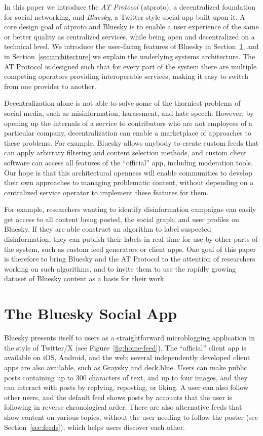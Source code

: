 \documentclass[sigconf,review]{acmart}
\begin{document}
In this paper we introduce the \emph{AT Protocol} (atproto), a decentralized foundation for social networking, and \emph{Bluesky}, a Twitter-style social app built upon it.
A core design goal of atproto and Bluesky is to enable a user experience of the same or better quality as centralized services, while being open and decentralized on a technical level.
We introduce the user-facing features of Bluesky in Section~\ref{sec:product}, and in Section~\ref{sec:architecture} we explain the underlying systems architecture.
The AT Protocol is designed such that for every part of the system there are multiple competing operators providing interoperable services, making it easy to switch from one provider to another.

Decentralization alone is not able to solve some of the thorniest problems of social media, such as misinformation, harassment, and hate speech.
However, by opening up the internals of a service to contributors who are not employees of a particular company, decentralization can enable a marketplace of approaches to these problems.
For example, Bluesky allows anybody to create custom feeds that can apply arbitrary filtering and content selection methods, and custom client software can access all features of the ``official'' app, including moderation tools.
Our hope is that this architectural openness will enable communities to develop their own approaches to managing problematic content, without depending on a centralized service operator to implement these features for them.

For example, researchers wanting to identify disinformation campaigns can easily get access to all content being posted, the social graph, and user profiles on Bluesky.
If they are able construct an algorithm to label suspected disinformation, they can publish their labels in real time for use by other parts of the system, such as custom feed generators or client apps.
One goal of this paper is therefore to bring Bluesky and the AT Protocol to the attention of researchers working on such algorithms, and to invite them to use the rapidly growing dataset of Bluesky content as a basis for their work.

\section{The Bluesky Social App}\label{sec:product}

Bluesky presents itself to users as a straightforward microblogging application in the style of Twitter/X (see Figure~\ref{fig:home-feed}).
The ``official'' client app is available on iOS, Android, and the web; several independently developed client apps are also available, such as Graysky and deck.blue. %
Users can make public posts containing up to 300 characters of text, and up to four images, and they can interact with posts by replying, reposting, or liking.
A user can also follow other users, and the default feed shows posts by accounts that the user is following in reverse chronological order.
There are also alternative feeds that show content on various topics, without the user needing to follow the poster (see Section~\ref{sec:feeds}), which helps users discover each other.
\end{document}

